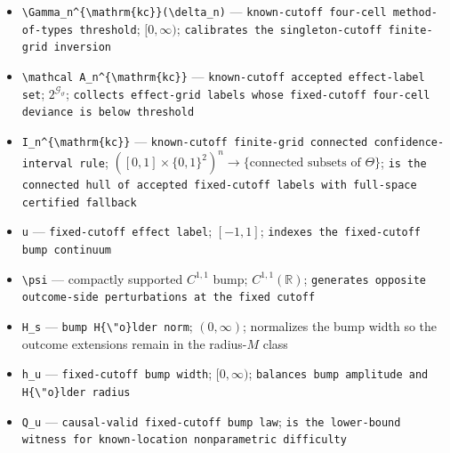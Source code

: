 \documentclass{article}
\begin{document}
\begin{itemize}
  \par\smallskip\noindent\emph{Definition.} The total connected interval rule derived by \(\text{oeq:all-strength-profile}\) from \(\mathsf H_{\mathrm{prof}}\).
  \item \texttt{\textbackslash{}\allowbreak{}Gamma\_\allowbreak{}n\textasciicircum{}\{\textbackslash{}\allowbreak{}mathrm\{kc\}\allowbreak{}\}\allowbreak{}(\textbackslash{}\allowbreak{}delta\_\allowbreak{}n)} --- \texttt{known-\allowbreak{}cutoff four-\allowbreak{}cell method-\allowbreak{}of-\allowbreak{}types threshold}; \([0,\infty)\); \texttt{calibrates the singleton-\allowbreak{}cutoff finite-\allowbreak{}grid inversion}
  \item \texttt{\textbackslash{}\allowbreak{}mathcal A\_\allowbreak{}n\textasciicircum{}\{\textbackslash{}\allowbreak{}mathrm\{kc\}\allowbreak{}\}\allowbreak{}} --- \texttt{known-\allowbreak{}cutoff accepted effect-\allowbreak{}label set}; \(2^{\mathcal G_\vartheta}\); \texttt{collects effect-\allowbreak{}grid labels whose fixed-\allowbreak{}cutoff four-\allowbreak{}cell deviance is below threshold}
  \item \texttt{I\_\allowbreak{}n\textasciicircum{}\{\textbackslash{}\allowbreak{}mathrm\{kc\}\allowbreak{}\}\allowbreak{}} --- \texttt{known-\allowbreak{}cutoff finite-\allowbreak{}grid connected confidence-\allowbreak{}interval rule}; \(([0,1]\times\{0,1\}^2)^n\to\{\text{connected subsets of }\Theta\}\); \texttt{is the connected hull of accepted fixed-\allowbreak{}cutoff labels with full-\allowbreak{}space certified fallback}
  \item \texttt{u} --- \texttt{fixed-\allowbreak{}cutoff effect label}; \([-1,1]\); \texttt{indexes the fixed-\allowbreak{}cutoff bump continuum}
  \item \texttt{\textbackslash{}\allowbreak{}psi} --- compactly supported \(C^{1,1}\) bump; \(C^{1,1}(\mathbb R)\); \texttt{generates opposite outcome-\allowbreak{}side perturbations at the fixed cutoff}
  \item \texttt{H\_\allowbreak{}s} --- \texttt{bump H\{\textbackslash{}\allowbreak{}"o\}\allowbreak{}lder norm}; \((0,\infty)\); normalizes the bump width so the outcome extensions remain in the radius-\(M\) class
  \item \texttt{h\_\allowbreak{}u} --- \texttt{fixed-\allowbreak{}cutoff bump width}; \([0,\infty)\); \texttt{balances bump amplitude and H\{\textbackslash{}\allowbreak{}"o\}\allowbreak{}lder radius}
  \item \texttt{Q\_\allowbreak{}u} --- \texttt{causal-\allowbreak{}valid fixed-\allowbreak{}cutoff bump law}; \texttt{is the lower-\allowbreak{}bound witness for known-\allowbreak{}location nonparametric difficulty}

\end{itemize}
\end{document}
